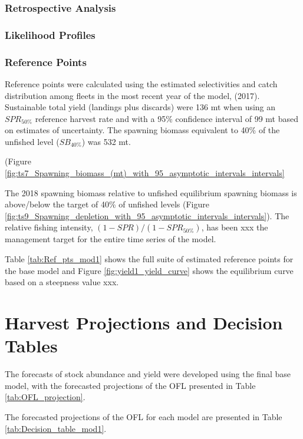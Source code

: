 \documentclass[12pt,]{article}
\begin{document}
\subsubsection{Retrospective Analysis}\label{retrospective-analysis}

\subsubsection{Likelihood Profiles}\label{likelihood-profiles}

\subsubsection{Reference Points}\label{reference-points-1}

Reference points were calculated using the estimated selectivities and
catch distribution among fleets in the most recent year of the model,
(2017). Sustainable total yield (landings plus discards) were 136 mt
when using an \(SPR_{50\%}\) reference harvest rate and with a 95\%
confidence interval of 99 mt based on estimates of uncertainty. The
spawning biomass equivalent to 40\% of the unfished level
(\(SB_{40\%}\)) was 532 mt.

(Figure
\ref{fig:ts7_Spawning_biomass_(mt)_with_95_asymptotic_intervals_intervals}

The 2018 spawning biomass relative to unfished equilibrium spawning
biomass is above/below the target of 40\% of unfished levels (Figure
\ref{fig:ts9_Spawning_depletion_with_95_asymptotic_intervals_intervals}).
The relative fishing intensity, \((1-SPR)/(1-SPR_{50\%})\), has been xxx
the management target for the entire time series of the model.

Table \ref{tab:Ref_pts_mod1} shows the full suite of estimated reference
points for the base model and Figure \ref{fig:yield1_yield_curve} shows
the equilibrium curve based on a steepness value xxx.

\section{Harvest Projections and Decision
Tables}\label{harvest-projections-and-decision-tables}

The forecasts of stock abundance and yield were developed using the
final base model, with the forecasted projections of the OFL presented
in Table \ref{tab:OFL_projection}.

The forecasted projections of the OFL for each model are presented in
Table \ref{tab:Decision_table_mod1}.
\end{document}
